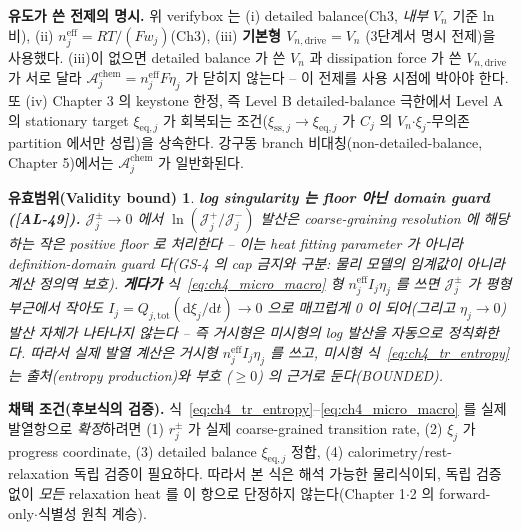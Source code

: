 \documentclass[11pt,a4paper]{article}
\newtheorem*{boundbox}{유효범위(Validity bound)}
\newcommand{\dd}{\mathrm{d}}
\newcommand{\eff}{\mathrm{eff}}
\newcommand{\eq}{\mathrm{eq}}
\newcommand{\drive}{\mathrm{drive}}
\newcommand{\tot}{\mathrm{tot}}
\newcommand{\chem}{\mathrm{chem}}
\newcommand{\sstat}{\mathrm{ss}}
\newcommand{\AL}[1]{\textsf{[AL-#1]}}
\begin{document}
\textbf{유도가 쓴 전제의 명시.} 위 verifybox 는 (i) detailed balance(Ch3, \emph{내부}
$V_n$ 기준 ln 비), (ii) $n_j^{\eff}=RT/(Fw_j)$(Ch3), (iii) \textbf{기본형 $V_{n,\drive}=V_n$}
(3단계서 명시 전제)을 사용했다. (iii)이 없으면 detailed balance 가 쓴 $V_n$ 과 dissipation force 가 쓴
$V_{n,\drive}$ 가 서로 달라 $\mathcal A_j^{\chem}=n_j^{\eff}F\eta_j$ 가 닫히지 않는다 -- 이 전제를 사용 시점에
박아야 한다. 또 (iv) Chapter 3 의 keystone 한정, 즉 Level B detailed-balance 극한에서 Level A 의 stationary
target $\xi_{\eq,j}$ 가 회복되는 조건($\xi_{\sstat,j}\to\xi_{\eq,j}$ 가 $C_j$ 의 $V_n$$\cdot$$\xi_j$-무의존
partition 에서만 성립)을 상속한다. 강구동 branch 비대칭(non-detailed-balance, Chapter 5)에서는
$\mathcal A_j^{\chem}$ 가 일반화된다.

\begin{boundbox}
\textbf{log singularity 는 floor 아닌 domain guard (\AL{49}).} $\mathcal J_j^\pm\to0$ 에서 $\ln(\mathcal J_j^+/\mathcal J_j^-)$
발산은 coarse-graining resolution 에 해당하는 작은 positive floor 로 처리한다 -- 이는 heat fitting parameter 가
아니라 \emph{definition-domain guard} 다(GS-4 의 cap 금지와 구분: 물리 모델의 임계값이 아니라 계산 정의역 보호).
\textbf{게다가} 식~\eqref{eq:ch4_micro_macro} 형 $n_j^{\eff}I_j\eta_j$ 를 쓰면 $\mathcal J_j^\pm$ 가 평형 부근에서
작아도 $I_j=Q_{j,\tot}(\dd\xi_j/\dd t)\to0$ 으로 \emph{매끄럽게} 0 이 되어(그리고 $\eta_j\to0$) 발산 자체가
나타나지 않는다 -- 즉 거시형은 미시형의 log 발산을 자동으로 정칙화한다. 따라서 실제 발열 계산은 거시형
$n_j^{\eff}I_j\eta_j$ 를 쓰고, 미시형 식~\eqref{eq:ch4_tr_entropy} 는 \emph{출처(entropy production)와 부호
($\ge0$) 의 근거}로 둔다(BOUNDED).
\end{boundbox}

\textbf{채택 조건(후보식의 검증).} 식~\eqref{eq:ch4_tr_entropy}--\eqref{eq:ch4_micro_macro} 를 실제 발열항으로
\emph{확정}하려면 (1) $r_j^\pm$ 가 실제 coarse-grained transition rate, (2) $\xi_j$ 가 progress coordinate,
(3) detailed balance $\xi_{\eq,j}$ 정합, (4) calorimetry/rest-relaxation 독립 검증이 필요하다. 따라서 본 식은
해석 가능한 물리식이되, 독립 검증 없이 \emph{모든} relaxation heat 를 이 항으로 단정하지 않는다(Chapter 1$\cdot$2
의 forward-only$\cdot$식별성 원칙 계승).

\end{document}
